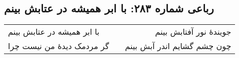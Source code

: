 \begin{center}
\section*{رباعی شماره ۲۸۳: با ابر همیشه در عتابش بینم}
\label{sec:sh283}
\begin{longtable}{l p{0.5cm} r}
با ابر همیشه در عتابش بینم
&&
جویندهٔ نور آفتابش بینم
\\
گر مردمک دیدهٔ من نیست چرا
&&
چون چشم گشایم اندر آبش بینم
\\
\end{longtable}
\end{center}
